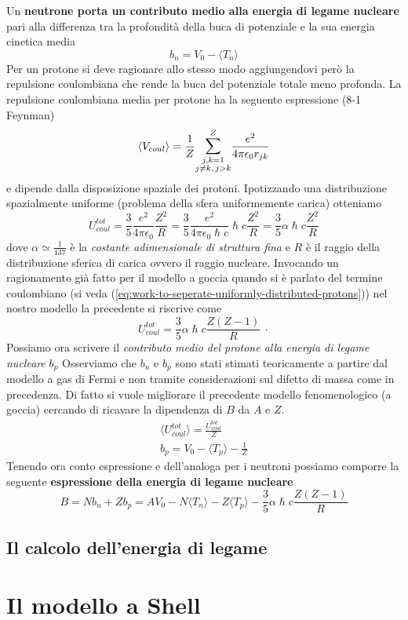 Un \textbf{neutrone porta un contributo medio alla energia di legame nucleare} pari alla differenza tra la profondità della buca di potenziale e la sua energia cinetica media
\[
b_{n} = V_{0} - \langle T_{n} \rangle
\]
Per un protone si deve ragionare allo stesso modo aggiungendovi però la repulsione coulombiana che rende la buca del potenziale totale meno profonda.
La repulsione coulombiana media per protone ha la seguente espressione (8-1 Feynman\cite{FeynLect2})
\[
	\langle V_{coul} \rangle = \frac{1}{Z} \mathlarger{\sum}_{\substack{j,k=1 \\ j \neq k, \,j > k  }}^{Z} \frac{e^{2}}{4 \pi \epsilon_{0}r_{jk}}\]
e dipende dalla disposizione spaziale dei protoni.
Ipotizzando una distribuzione spazialmente uniforme (problema della sfera uniformemente carica) otteniamo
\[
U_{coul}^{tot} = \frac{3}{5} \frac{e^{2}}{4 \pi \epsilon_{0}} \frac{Z^{2}}{R} = \frac{3}{5} \frac{e^{2}}{4 \pi \epsilon_{0} \hslash c} \hslash c \frac{Z^{2}}{R} = \frac{3}{5} \alpha \hslash c \frac{Z^{2}}{R}
\]
dove $\alpha \simeq \frac{1}{137}$ è la \emph{costante adimensionale di struttura fina} e $R$ è il raggio della distribuzione sferica di carica ovvero il raggio nucleare.
Invocando un ragionamento già fatto per il modello a goccia quando si è parlato del termine coulombiano (si veda (\ref{eq:work-to-seperate-uniformly-distributed-protons})) nel nostro modello la precedente si riscrive come
\[
U_{coul}^{tot} = \frac{3}{5} \alpha \hslash c \frac{Z (Z-1)}{R} \ \cdot
\]
Possiamo ora scrivere il \emph{contributo medio del protone alla energia di legame nucleare} $b_{p}$\sidenote
{
Osserviamo che $ b_n$ e $ b_p$ sono stati stimati teoricamente a partire dal modello a gas di Fermi e non tramite
considerazioni sul difetto di massa come in precedenza. Di fatto si vuole migliorare il precedente modello fenomenologico
(a goccia) cercando di ricavare la dipendenza di $ B$ da $ A$ e $ Z$.
}
\begin{gather*}
    \langle U^{tot}_{coul} \rangle = \frac{U^{tot}_{coul}}{Z}\\
    b_{p} = V_{0} - \langle T_{p} \rangle  - \frac{1}{Z}
\end{gather*}
Tenendo ora conto espressione e dell’analoga per i neutroni possiamo comporre la seguente \textbf{espressione della energia di legame nucleare}
\begin{equation}
	B = N b_{n} + Z b_{p} = A V_{0} - N \langle T_{n} \rangle - Z \langle T_{p} \rangle - \frac{3}{5} \alpha \hslash c \frac{Z(Z-1)}{R}
	\label{eq:binding-energy-fermi-gas-model}
\end{equation}


\subsection{Il calcolo dell'energia di legame}\label{sec:calcolo-energia-legame-fermions-gas}



\section{Il modello a Shell}\label{sec:il-modello-a-shell}


